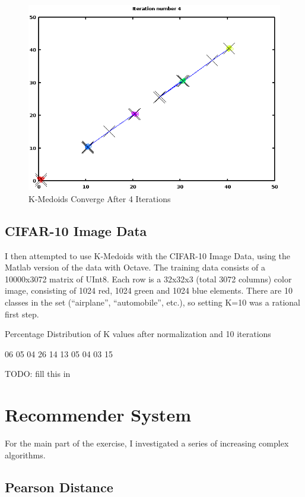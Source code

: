 \documentclass[11pt, oneside]{article}   	%
\begin{document}
\begin{figure}[h!]
\centering
\includegraphics[scale=0.6]{K-Medoid}
\caption{K-Medoids Converge After 4 Iterations}
\end{figure}

\subsection*{CIFAR-10 Image Data}

I then attempted to use K-Medoids with the CIFAR-10 Image Data, using the Matlab version of the data with Octave. The training data consists of a 10000x3072 matrix of UInt8. Each row is a 32x32x3 (total 3072 columns) color image, consisting of 1024 red, 1024 green and 1024 blue elements. There are 10 classes in the set (``airplane'', ``automobile'', etc.), so setting K=10 was a rational first step.

Percentage Distribution of K values after normalization and 10 iterations

06
05
04
26
14
13
05
04
03
15

TODO: fill this in
\clearpage

\section*{Recommender System}

For the main part of the exercise, I investigated a series of increasing complex algorithms. 

\subsection*{Pearson Distance}
\end{document}
